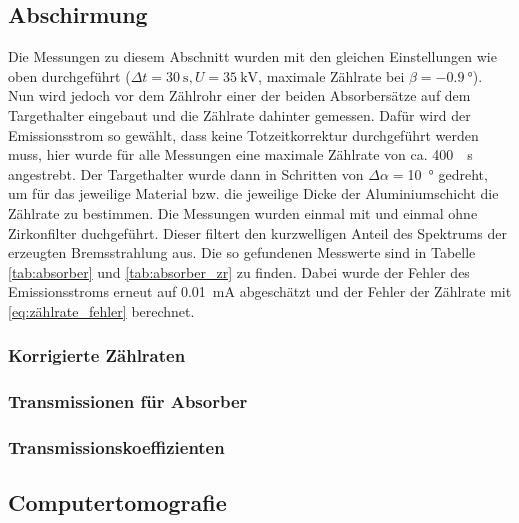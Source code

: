 \documentclass[11pt, a4paper]{article}
\numberwithin{equation}{section}
\begin{document}
\subsection{Abschirmung}

Die Messungen zu diesem Abschnitt wurden mit den gleichen Einstellungen wie oben durchgeführt ($\Delta t=\SI{30}{\second}, U=\SI{35}{\kilo\volt}$, maximale Zählrate bei $\beta=\SI{-0.9}{\degree}$).
Nun wird jedoch vor dem Zählrohr einer der beiden Absorbersätze auf dem Targethalter eingebaut und die Zählrate dahinter gemessen.
Dafür wird der Emissionsstrom so gewählt, dass keine Totzeitkorrektur durchgeführt werden muss, hier wurde für alle Messungen eine maximale Zählrate von ca. \SI{400}{\per\second} angestrebt.
Der Targethalter wurde dann in Schritten von $\Delta\alpha=$\SI{10}{\degree} gedreht, um für das jeweilige Material bzw. die jeweilige Dicke der Aluminiumschicht die Zählrate zu bestimmen.
Die Messungen wurden einmal mit und einmal ohne Zirkonfilter duchgeführt.
Dieser filtert den kurzwelligen Anteil des Spektrums der erzeugten Bremsstrahlung aus.
Die so gefundenen Messwerte sind in Tabelle \ref{tab:absorber} und \ref{tab:absorber_zr} zu finden.
Dabei wurde der Fehler des Emissionsstroms erneut auf \SI{0.01}{\milli\ampere} abgeschätzt und der Fehler der Zählrate mit \eqref{eq:zählrate_fehler} berechnet.

\subsubsection{Korrigierte Zählraten}

\subsubsection{Transmissionen für Absorber}

\subsubsection{Transmissionskoeffizienten}

\subsection{Computertomografie}
\end{document}
